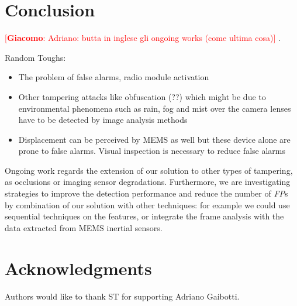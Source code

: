\documentclass{llncs}
\newcommand{\gi}[1]{{\textcolor{red}{[\small \textbf{Giacomo}: #1]}}}
\begin{document}



\section{Conclusion}\label{sec:Conclusion}
\gi{Adriano: butta in inglese gli ongoing works (come ultima cosa)}
.

Random Toughs:
\begin{itemize}
\item The problem of false alarms, radio module activation
\item Other tampering attacks like obfuscation (??) which might be due to environmental phenomena such as rain, fog and mist over the camera lenses have to be detected by image analysis methods
\item Displacement can be perceived by MEMS as well but these device alone are prone to false alarms. Visual inspection is necessary to reduce false alarms
\end{itemize}
Ongoing work regards the extension of our solution to other types of tampering, as occlusions or imaging sensor degradations.
Furthermore, we are investigating strategies to improve the detection performance and reduce the number of \textit{FP}s by combination of our solution with other techniques:
for example we could use sequential techniques on the features, or integrate the frame analysis with the data extracted from MEMS inertial sensors.   

\section*{Acknowledgments}\label{sec:Acknowledgments}
Authors would like to thank ST for supporting Adriano Gaibotti.




%	
%	
\end{document}

